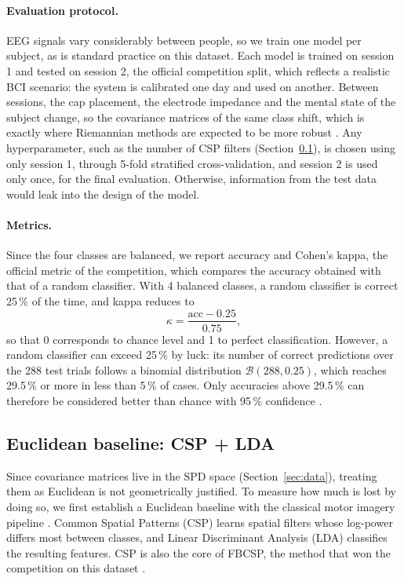 \paragraph{Evaluation protocol.}
EEG signals vary considerably between people, so we train one model per subject, as is standard practice on this dataset. Each model is trained on session 1 and tested on session 2, the official competition split, which reflects a realistic BCI scenario: the system is calibrated one day and used on another. Between sessions, the cap placement, the electrode impedance and the mental state of the subject change, so the covariance matrices of the same class shift, which is exactly where Riemannian methods are expected to be more robust \citep{congedo2017}. Any hyperparameter, such as the number of CSP filters (Section~\ref{sec:baseline}), is chosen using only session 1, through 5-fold stratified cross-validation, and session 2 is used only once, for the final evaluation. Otherwise, information from the test data would leak into the design of the model.

\paragraph{Metrics.}
Since the four classes are balanced, we report accuracy and Cohen's kappa, the official metric of the competition, which compares the accuracy obtained with that of a random classifier. With 4 balanced classes, a random classifier is correct 25\,\% of the time, and kappa reduces to
\begin{equation}
  \kappa = \frac{\mathrm{acc} - 0.25}{0.75},
  \label{eq:kappa}
\end{equation}
so that 0 corresponds to chance level and 1 to perfect classification. However, a random classifier can exceed 25\,\% by luck: its number of correct predictions over the 288 test trials follows a binomial distribution $\mathcal{B}(288, 0.25)$, which reaches 29.5\,\% or more in less than 5\,\% of cases. Only accuracies above 29.5\,\% can therefore be considered better than chance with 95\,\% confidence \citep{mullerputz2008}.


\subsection{Euclidean baseline: CSP + LDA}
\label{sec:baseline}

Since covariance matrices live in the SPD space (Section~\ref{sec:data}), treating them as Euclidean is not geometrically justified. To measure how much is lost by doing so, we first establish a Euclidean baseline with the classical motor imagery pipeline \citep{blankertz2008}. Common Spatial Patterns (CSP) learns spatial filters whose log-power differs most between classes, and Linear Discriminant Analysis (LDA) classifies the resulting features. CSP is also the core of FBCSP, the method that won the competition on this dataset \citep{ang2012}.


